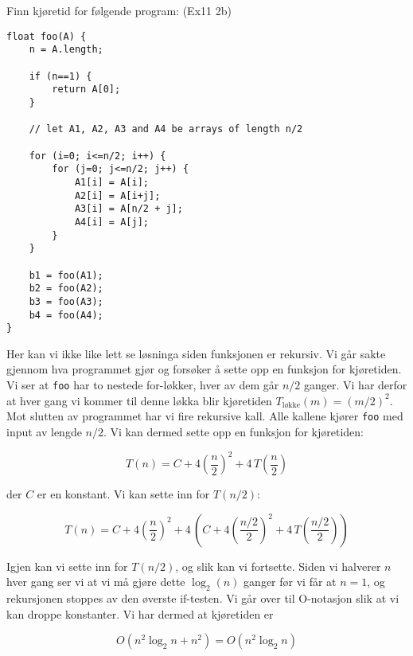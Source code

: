 ~\\~\\
\begin{eks} Finn kjøretid for følgende program: (Ex11 2b)
\begin{verbatim}
float foo(A) {
    n = A.length;
    
    if (n==1) {
        return A[0];
    }
    
    // let A1, A2, A3 and A4 be arrays of length n/2
    
    for (i=0; i<=n/2; i++) {
        for (j=0; j<=n/2; j++) {
            A1[i] = A[i];
            A2[i] = A[i+j];
            A3[i] = A[n/2 + j];
            A4[i] = A[j];
        }
    }
	
    b1 = foo(A1);
    b2 = foo(A2);
    b3 = foo(A3);
    b4 = foo(A4);
}
\end{verbatim}

Her kan vi ikke like lett se løsninga siden funksjonen er rekursiv. Vi går sakte gjennom hva programmet gjør og forsøker å sette opp en funksjon for kjøretiden. Vi ser at \verb|foo| har to nestede for-løkker, hver av dem går $ n/2 $ ganger. Vi har derfor at hver gang vi kommer til denne løkka blir kjøretiden $ T_{\text{løkke}}(m) = (m/2)^2 $. Mot slutten av programmet har vi fire rekursive kall. Alle kallene kjører \verb|foo| med input av lengde $ n/2 $. Vi kan dermed sette opp en funksjon for kjøretiden:

\[ T(n) = C + 4\left(\frac{n}{2}\right)^2 + 4\,T\left(\frac{n}{2}\right) \]

\noindent der $ C $ er en konstant.  Vi kan sette inn for $ T(n/2) $:

\[ T(n) = C + 4\left(\frac{n}{2}\right)^2 + 4\,\left(C + 4\left(\frac{n/2}{2}\right)^2 + 4\,T\left(\frac{n/2}{2}\right)\right)  \]

Igjen kan vi sette inn for $ T(n/2) $, og slik kan vi fortsette. Siden vi halverer $ n $ hver gang ser vi at vi må gjøre dette $ \log_2(n) $ ganger før vi får at $ n=1 $, og rekursjonen stoppes av den øverste if-testen. Vi går over til O-notasjon slik at vi kan droppe konstanter. Vi har dermed at kjøretiden er

\[ O\left(n^2\log_2 n + n^2\right) = O\left(n^2 \log_2 n\right) \]
\end{eks}